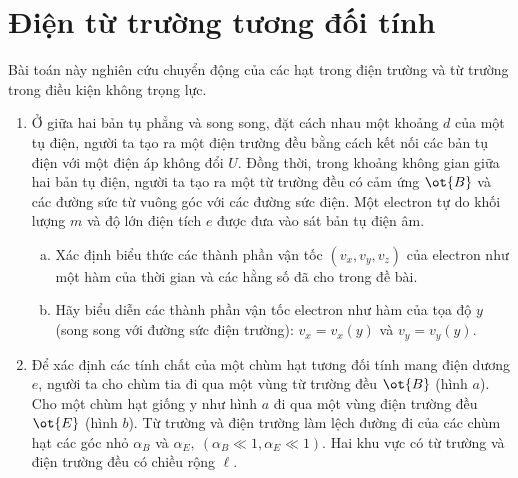 \chapter{Điện từ trường tương đối tính}


\begin{vd}
Bài toán này nghiên cứu chuyển động của các hạt trong điện trường và từ trường trong điều kiện không trọng lực.
\begin{enumerate}[1)]
    \item Ở giữa hai bản tụ phẳng và song song, đặt cách nhau một khoảng $d$ của một tụ điện, người ta tạo ra một điện trường đều bằng cách kết nối các bản tụ điện với một điện áp không đổi ${U}$. Đồng thời, trong khoảng không gian giữa hai bản tụ điện, người ta tạo ra một từ trường đều có cảm ứng $\ot{B}$ và các đường sức từ vuông góc với các đường sức điện. Một electron tự do khối lượng ${m}$ và độ lớn điện tích $e$ được đưa vào sát bản tụ điện âm.
    \begin{enumerate}[a)]
        \item Xác định biểu thức các thành phần vận tốc $\left(v_{x}, v_{y}, v_{z}\right)$ của electron như một hàm của thời gian và các hằng số đã cho trong đề bài.
        \item Hãy biểu diễn các thành phần vận tốc electron như hàm của tọa độ $y$ (song song với đường sức điện trường): $v_{x} = v_{x}(y)$ và $v_{y} = v_{y}(y)$.
    \end{enumerate}
    \item Để xác định các tính chất của một chùm hạt tương đối tính mang điện dương $e$, người ta cho chùm tia đi qua một vùng từ trường đều $\ot{B}$ (hình $a$). Cho một chùm hạt giống y như hình $a$ đi qua một vùng điện trường đều $\ot{E}$ (hình $b$). Từ trường và điện trường làm lệch đường đi của các chùm hạt các góc nhỏ $\alpha_{B}$ và $\alpha_{E}, ~\left(\alpha_{B} \ll 1, \alpha_{E} \ll 1\right)$. Hai khu vực có từ trường và điện trường đều có chiều rộng $\ell$.
       \begin{center}

\begin{tikzpicture}[x=0.75pt,y=0.75pt,yscale=-0.9,xscale=0.9]


\end{tikzpicture}
\end{center}
\end{enumerate}
\end{vd}
